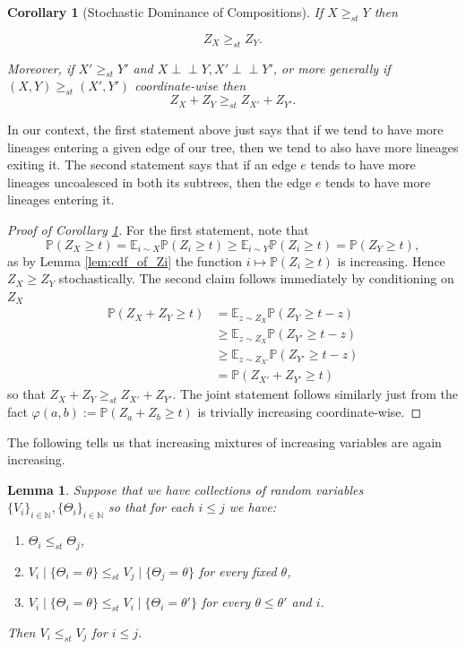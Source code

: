 \documentclass[10pt,oneside,reqno]{article}
\theoremstyle{plain}
\newtheorem{lemma}[theorem]{Lemma}
\newtheorem{corollary}[theorem]{Corollary}
\theoremstyle{definition}
\numberwithin{equation}{section}
\renewcommand{\leq}{\leqslant}
\renewcommand{\geq}{\geqslant}
\renewcommand{\phi}{\varphi}
\newcommand{\N}{\mathbb{N}}
\newcommand{\E}{\mathbb{E}}
\renewcommand{\P}{\mathbb{P}}
\newcommand{\indep}{\perp\!\!\!\perp}
\begin{document}
\begin{corollary}[Stochastic Dominance of Compositions]
    If $X \geq_{st} Y$ then
    
    \[Z_X \geq_{st} Z_{Y}.\]
    
    \noindent Moreover, if $X' \geq_{st} Y'$ and $X \indep Y, X' \indep Y'$, or more generally if $(X,Y) \geq_{st} (X',Y')$ coordinate-wise then
        \[Z_X + Z_{Y} \geq_{st} Z_{X'}+ Z_{Y'}.\]
\label{corollary:stochastic_dominance_composition}
\end{corollary}

\noindent In our context, the first statement above just says that if we tend to have more lineages entering a given edge of our tree, then we tend to also have more lineages exiting it. The second statement says that if an edge $e$ tends to have more lineages uncoalesced in both its subtrees, then the edge $e$ tends to have more lineages entering it. 

\begin{proof}[Proof of Corollary \ref{corollary:stochastic_dominance_composition}]
    For the first statement, note that
    \[\P(Z_X \geq t) = \E_{i \sim X} \P(Z_i \geq t) \geq \E_{i \sim Y} \P(Z_i \geq t) = \P(Z_Y \geq t),\]
    \noindent as by Lemma \ref{lem:cdf_of_Zi} the function $i \mapsto \P(Z_i \geq t)$ is increasing. Hence $Z_X \geq Z_Y$ stochastically. The second claim follows immediately by conditioning on $Z_X$
    \begin{align*}
        \mathbb{P}(Z_X + Z_Y \geq t) &= \mathbb{E}_{z \sim Z_X} \mathbb{P}(Z_Y \geq t-z) \\
        &\geq \mathbb{E}_{z \sim Z_X} \mathbb{P}(Z_{Y'} \geq t-z) \\
        &\geq \mathbb{E}_{z \sim Z_{X'}} \mathbb{P}(Z_{Y'} \geq t-z) \\
        &= \mathbb{P}(Z_{X'} + Z_{Y'} \geq t)
    \end{align*}
    \noindent so that $Z_X + Z_Y \geq_{st} Z_{X'} + Z_{Y'}$. The joint statement follows similarly just from the fact $\phi(a,b) := \P(Z_a + Z_b \geq t)$ is trivially increasing coordinate-wise. 
\end{proof}


\noindent The following tells us that increasing mixtures of increasing variables are again increasing. 
\begin{lemma}
    Suppose that we have collections of random variables $\{V_i\}_{i \in \N}, \{\Theta_i\}_{i \in \N}$ so that for each $i \leq j$ we have:
    \begin{enumerate}[label=\alph*)]
        \item $\Theta_i \leq_{st} \Theta_j$,
        \item $V_i \mid \{\Theta_i = \theta\} \leq_{st} V_j \mid \{\Theta_j = \theta\}$ for every fixed $\theta$,
         \item $V_i \mid \{\Theta_i = \theta\} \leq_{st} V_i \mid \{\Theta_i = \theta'\}$ for every $\theta \leq \theta'$ and $i$.
    \end{enumerate}
    \noindent Then $V_i \leq_{st} V_j$ for $i \leq j$. 
\label{lem:mixtures_and_stochastic_dominance}
\end{lemma}
\end{document}
